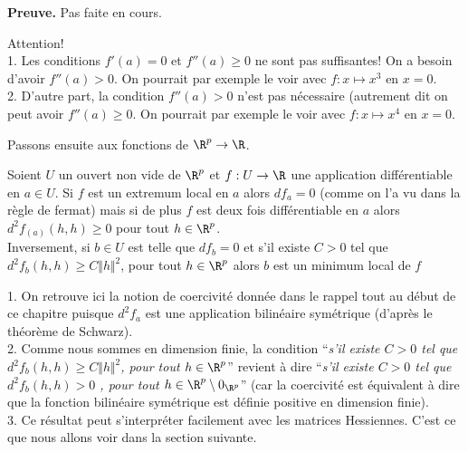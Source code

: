 \documentclass[12pt, class=report,crop=false]{standalone}
\begin{document}
{{\textbf{Preuve.}}  Pas faite en cours.




\begin{remarque*}
\textcolor[rgb]{0.00,0.00,1.00}{
  Attention! \\
1. Les conditions $f'(a)=0$ et $f''(a) \geq 0$ ne sont pas suffisantes! On a besoin d'avoir $f''(a)>0$. On pourrait par exemple le voir avec $f: x \mapsto x^3$ en $x=0$.\\
2. D'autre part, la condition $f''(a) >0$ n'est pas nécessaire (autrement dit on peut avoir $f''(a) \geq 0$. On pourrait par exemple le voir avec  $f: x \mapsto x^4$ en $x=0$.}
\end{remarque*}


\noindent Passons ensuite aux fonctions de $\R^p \rightarrow \R$.


\begin{proposition}
\textcolor[rgb]{0.44,0.00,0.87}{
 Soient $U$ un ouvert non vide de $\R^p$ et $f: U  \rightarrow \R$ une application différentiable en $a \in U$. Si $f$ est un extremum local en $a$ alors  $df_a=0$ (comme on l'a vu dans la règle de fermat) mais si de plus $f$ est deux fois différentiable en $a$ alors
 $d^2f_(a)(h,h) \geq 0$ pour tout $h \in \R^p$.\\
 Inversement, si $b \in U$ est telle que $df_b=0$ et s'il existe $C>0$ tel que $d^2f_b (h,h) \geq C \Vert h \Vert^2$, pour tout $h \in \R^p$ alors $b$ est un minimum local de $f$}
\end{proposition}

\begin{remarque*} $ $\\
\textcolor[rgb]{0.00,0.00,1.00}{
1. On retrouve ici la notion de coercivité donnée dans le rappel tout au début de ce chapitre puisque $d^2f_a$ est une application bilinéaire symétrique (d'après le théorème de Schwarz).\\ 
2. Comme nous sommes en dimension finie, la condition ``\textit{s'il existe $C>0$ tel que $d^2f_b (h,h) \geq C \Vert h \Vert^2$, pour tout $h \in \R^p$}'' revient à dire ``\textit{s'il existe $C>0$ tel que $d^2f_b (h,h) >0$ , pour tout $h \in \R^p \setminus 0_{\R^p}$}'' (car la coercivité est équivalent à dire que la fonction bilinéaire symétrique est définie positive en dimension finie).\\
3. Ce résultat peut s'interpréter facilement avec les matrices Hessiennes. C'est ce que nous allons voir dans la section suivante.
}
\end{remarque*}

}
\end{document}
